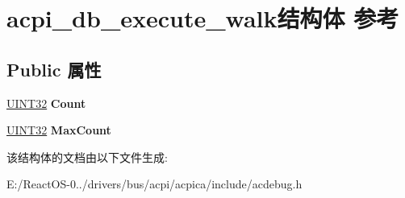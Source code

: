 \hypertarget{structacpi__db__execute__walk}{}\section{acpi\+\_\+db\+\_\+execute\+\_\+walk结构体 参考}
\label{structacpi__db__execute__walk}
\subsection*{Public 属性}
\begin{DoxyCompactItemize}
\item 
\mbox{\label{structacpi__db__execute__walk_ad73e7f32d2b0a57cbdb7b01f35e95c7f}} 
\hyperlink{_processor_bind_8h_ae1e6edbbc26d6fbc71a90190d0266018}{U\+I\+N\+T32} {\bfseries Count}
\item 
\mbox{\label{structacpi__db__execute__walk_a4bc685312c99d0ce00b3996e4854cdcf}} 
\hyperlink{_processor_bind_8h_ae1e6edbbc26d6fbc71a90190d0266018}{U\+I\+N\+T32} {\bfseries Max\+Count}
\end{DoxyCompactItemize}


该结构体的文档由以下文件生成\+:\begin{DoxyCompactItemize}
\item 
E\+:/\+React\+O\+S-\/0../drivers/bus/acpi/acpica/include/acdebug.\+h\end{DoxyCompactItemize}
